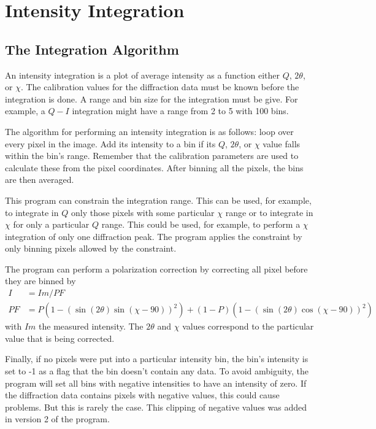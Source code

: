 \chapter{Intensity Integration}

\section{The Integration Algorithm}\label{integration_algorithm}

An intensity integration is a plot of average intensity as 
a function either $Q$, $2\theta$, or $\chi$. The calibration 
values for the diffraction data must be known before 
the integration is done. A range and bin size for the
integration must be give. For example, a $Q-I$ integration 
might have a range from 2 to 5 with 100 bins. 

The algorithm for performing an intensity integration
is as follows: loop over every pixel in the image. 
Add its intensity to a bin if its $Q$, $2\theta$, 
or $\chi$ value falls within the bin's range.
Remember that the calibration parameters are used to 
calculate these from the pixel coordinates.
After binning all the pixels, the bins are then averaged.

This program can constrain the integration range. 
This can be used, for example, to integrate
in $Q$ only those pixels with some particular 
$\chi$ range or to integrate
in $\chi$ for only a particular
$Q$ range. This could be used, for example, to
perform a $\chi$ integration of only one
diffraction peak. The program applies the constraint
by only binning pixels allowed by the constraint.

The program can perform a polarization 
correction by correcting all pixel before they
are binned by
\begin{align}
    I&=Im/PF \\ 
    PF&=P(1 - (\sin(2\theta)\sin(\chi-90))^2) + 
    (1 - P)(1 - (\sin(2\theta)\cos(\chi-90))^2)
\end{align}
with $Im$ the measured intensity.  The $2\theta$ 
and $\chi$ values correspond to the particular 
value that is being corrected.

Finally, if no pixels were put into a particular
intensity bin, the bin's intensity is set to -1 as
a flag that the bin doesn't contain any data.
To avoid ambiguity, the program will
set all bins with negative intensities to have
an intensity of zero. If the diffraction data contains 
pixels with negative values, this could cause problems. 
But this is rarely the case. This clipping of negative 
values was added in version 2 of the program.


